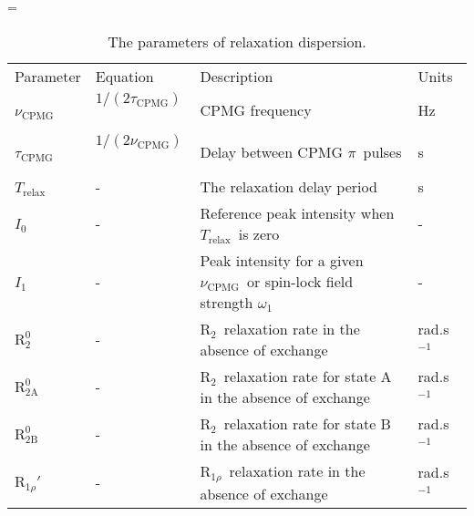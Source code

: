 \documentclass[a4paper,11pt,twoside,openright]{book}
\makeatletter
\let\realnormalsize=\normalsize
\def\liih@math{\ifmmode$\else\bad@math\fi}
\def\adjustnormalsize{\def\normalsize{\mathsurround=0pt \realnormalsize
 \parindent=0pt\abovedisplayskip=0pt\belowdisplayskip=0pt}%
 \def\phantompar{\csname par\endcsname}\normalsize}%
\newcommand\lthtmlvboxmathA{\adjustnormalsize\setbox\sizebox=\vbox\bgroup %
 \let\ifinner=\iffalse \let\)\liih@math }%
\newcommand\lthtmlmathtype[1]{\gdef\lthtmlmathenv{#1}}%
\newcommand\lthtmlfigureA[1]{\let\@savefreelist\@freelist
       \lthtmlmathtype{#1}\lthtmlvboxmathA}%
\makeatother
\begin{document}
{\newpage\clearpage
\lthtmlfigureA{landscape9357}%
\begin{landscape}

\begin{center}
\begin{small}
\par
\begin{longtable}{llll}
\par
\caption[The parameters of relaxation dispersion.]{The parameters of relaxation dispersion.}
\par
\\
\toprule
Parameter          & Equation                       & Description                                                                   & Units \\
\midrule
\endhead
\par
\bottomrule
\endfoot
\par
\par
$\nu_\textrm{CPMG}$\           & $1 / (2 \tau_\textrm{CPMG})$\              & CPMG frequency                                                                & Hz \\
$\tau_\textrm{CPMG}$\          & $1 / (2 \nu_\textrm{CPMG})$\               & Delay between CPMG $\pi$\  pulses                                               & s \\
$T_\textrm{relax}$\  & -                              & The relaxation delay period                                                   & s \\
$I_0$\               & -                              & Reference peak intensity when $T_\textrm{relax}$\  is zero                      & - \\
$I_1$\               & -                              & Peak intensity for a given $\nu_\textrm{CPMG}$\  or spin-lock field strength $\omega_1$\    & - \\
$\mathrm{R}_2^0$\         & -                              & $\mathrm{R}_2$\  relaxation rate in the absence of exchange                            & rad.s$^{-1}$\  \\
$\mathrm{R}_\mathrm{2A}^0$\        & -                              & $\mathrm{R}_2$\  relaxation rate for state A in the absence of exchange                & rad.s$^{-1}$\  \\
$\mathrm{R}_\mathrm{2B}^0$\        & -                              & $\mathrm{R}_2$\  relaxation rate for state B in the absence of exchange                & rad.s$^{-1}$\  \\
$\mathrm{R}_{1\rho}'$\     & -                              & $\mathrm{R}_{1\rho}$\  relaxation rate in the absence of exchange                         & rad.s$^{-1}$\  \\

\end{longtable}
\end{small}
\end{center}
\end{landscape}}
\end{document}
